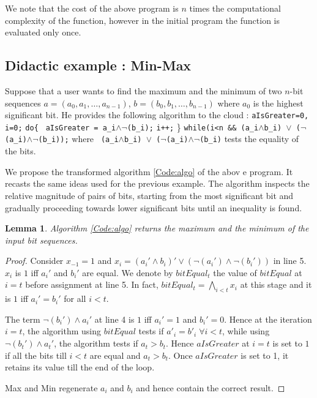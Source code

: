 \documentclass{acm_proc_article-sp}
\begin{document}
We note that the cost of the above program is $n$ times the computational complexity of the function, however in the initial program the function is evaluated only once.

\subsection{ Didactic example :  Min-Max}
\label{sec:ex}
Suppose that a user wants to find the maximum and the minimum of two $n$-bit sequences $a = (a_0,a_1,\ldots, a_{n-1})$, $b=(b_0,b_1,\ldots, b_{n-1})$ where $a_0$ is the highest significant bit. He provides the following algorithm to the cloud :
\newline \phantom{x} \texttt{aIsGreater=0, i=0;}
\newline \phantom{x} \texttt{do\{ }
\newline \phantom{x} \hspace{6ex} \texttt{aIsGreater = a\_i$ \wedge \neg$(b\_i);} 
\newline \phantom{x} \hspace{7ex} \texttt{i++;} 
\newline   \phantom{x} \} \texttt{while(i<n \&\& (a\_i$\wedge$b\_i) $\vee$ ($\neg$(a\_i)$\wedge \neg$(b\_i));}
\newline \newline
where \texttt{ (a\_i$\wedge$b\_i) $\vee$ ($\neg$(a\_i)$\wedge \neg$(b\_i)} tests the equality of the bits.

We propose the transformed algorithm \autoref{Code:algo} of the abov
e program. It recasts the same ideas used for the previous example. The algorithm inspects the relative magnitude of pairs of bits, starting from the most significant bit and gradually proceeding towards lower significant bits until an inequality is found.
 
\newtheorem{theorem}{Lemma}
\begin{theorem}
Algorithm \autoref{Code:algo} returns the maximum and the minimum of the input bit sequences. 
\end{theorem}

\begin{proof}

  Consider $x_{-1}=1$ and $x_i = (a_i'\wedge b_i)'\vee (\neg(a_i')\wedge\neg(b_i')) $ in line 5. $x_i$ is $1$ iff $a_i'$ and $b_i'$ are equal. We denote by $bitEqual_{t}$ the value of $bitEqual$ at $i=t$ before assignment at line 5. In fact, $bitEqual_{t} = \bigwedge_{i<t}{x_i} $ at this stage and it is $1$ iff $a_i'=b_i'$ for all $i < t$. 

The term $\neg(b_i')\wedge a_i'$ at line 4 is $1$ iff $a_i'=1$ and $b_i'=0$. Hence at the iteration $i=t$, the algorithm using $bitEqual$ tests if $a'_i = b'_i \;\forall i<t$, while using $\neg(b_t')\wedge a_t'$, the algorithm tests if $a_t>b_t$. Hence $aIsGreater$ at $i=t$ is set to $1$ if all the bits till $i<t$ are equal and $a_t>b_t$. Once $aIsGreater$ is set to 1, it retains its value till the end of the loop.  

Max and Min regenerate $a_i$ and $b_i$ and hence contain the correct result.  
\end{proof}
\end{document}
